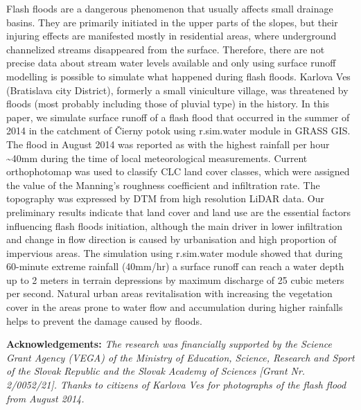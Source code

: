 {Flash floods are a dangerous phenomenon that usually affects small drainage basins. They are primarily initiated in the upper parts of the slopes, but their injuring effects are manifested mostly in residential areas, where underground channelized streams disappeared from the surface. Therefore, there are not precise data about stream water levels available and only using surface runoff modelling is possible to simulate what happened during flash floods. Karlova Ves (Bratislava city District), formerly a small viniculture village, was threatened by floods (most probably including those of pluvial type) in the history. In this paper, we simulate surface runoff of a flash flood that occurred in the summer of 2014 in the catchment of Čierny potok using r.sim.water module in GRASS GIS. The flood in August 2014 was reported as with the highest rainfall per hour \textasciitilde40mm during the time of local meteorological measurements. Current orthophotomap was used to classify CLC land cover classes, which were assigned the value of the Manning’s roughness coefficient and infiltration rate. The topography was expressed by DTM from high resolution LiDAR data. Our preliminary results indicate that land cover and land use are the essential factors influencing flash floods initiation, although the main driver in lower infiltration and change in flow direction is caused by urbanisation and high proportion of impervious areas. The simulation using r.sim.water module showed that during 60-minute extreme rainfall (40mm/hr) a surface runoff can reach a water depth up to 2 meters in terrain depressions by maximum discharge of 25 cubic meters per second. Natural urban areas revitalisation with increasing the vegetation cover in the areas prone to water flow and accumulation during higher rainfalls helps to prevent the damage caused by floods.

\vspace{0.5em}
\noindent
\textbf{Acknowledgements:}
\textit{The research was financially supported by the Science Grant Agency (VEGA) of the Ministry of Education, Science, Research and Sport of the Slovak Republic and the Slovak Academy of Sciences [Grant Nr. 2/0052/21]. Thanks to citizens of Karlova Ves for photographs of the flash flood from August 2014.}}%

